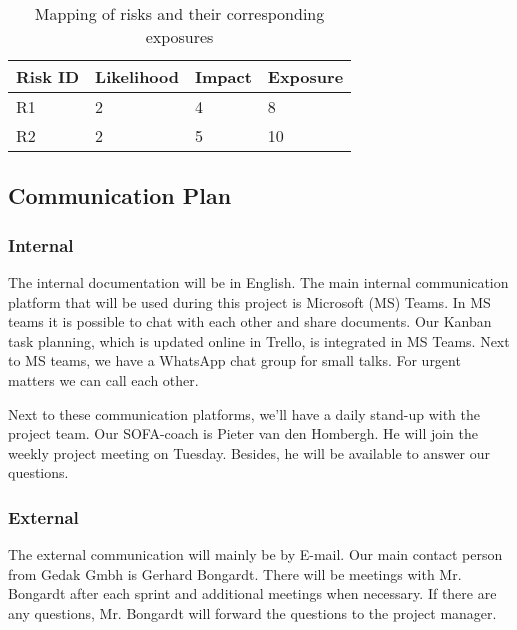 \begin{table}[htp]
    \caption{Mapping of risks and their corresponding exposures}
    \center
    \begin{tabular}{@{}|l|l|l|l|@{}}
        \toprule
        \textbf{Risk ID} & \textbf{Likelihood} & \textbf{Impact} & \textbf{Exposure} \\
        \hline
        R1      & 2          & 4      & 8        \\
        R2      & 2          & 5      & 10 \\
        \hline
    \end{tabular}\label{tab:table4}
\end{table}

\subsection{Communication Plan}

\subsubsection{Internal}

The internal documentation will be in English.
The main internal communication platform that will be used during this project is Microsoft (MS) Teams.
In MS teams it is possible to chat with each other and share documents.
Our Kanban task planning, which is updated online in Trello, is integrated in MS Teams.
Next to MS teams, we have a WhatsApp chat group for small talks.
For urgent matters we can call each other.


Next to these communication platforms, we’ll have a daily stand-up with the project team.
Our SOFA-coach is Pieter van den Hombergh.
He will join the weekly project meeting on Tuesday.
Besides, he will be available to answer our questions.

\subsubsection{External}

The external communication will mainly be by E-mail.
Our main contact person from Gedak Gmbh is Gerhard Bongardt.
There will be meetings with Mr. Bongardt after each sprint and additional meetings when necessary.
If there are any questions, Mr. Bongardt will forward the questions to the project manager.
